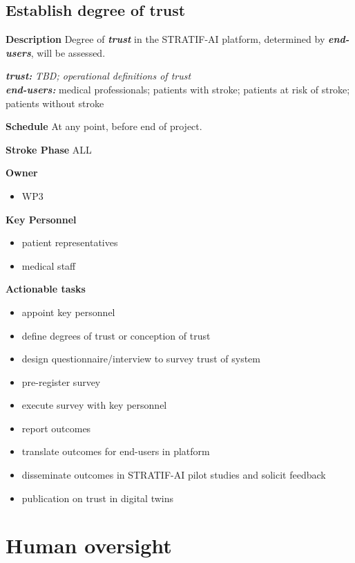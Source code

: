 \documentclass[
  letterpaper,
  DIV=11,
  numbers=noendperiod]{scrreport}
\providecommand{\tightlist}{%
  \setlength{\itemsep}{0pt}\setlength{\parskip}{0pt}}\usepackage{longtable,booktabs,array}
\begin{document}
\hypertarget{establish-degree-of-trust}{%
\subsection{Establish degree of trust}\label{establish-degree-of-trust}}

\textbf{Description} Degree of \textbf{\emph{trust}} in the STRATIF-AI
platform, determined by \textbf{\emph{end-users}}, will be assessed.

\textbf{\emph{trust:}} \emph{TBD; operational definitions of trust}\\
\textbf{\emph{end-users:}} medical professionals; patients with stroke;
patients at risk of stroke; patients without stroke

\textbf{Schedule} At any point, before end of project.

\textbf{Stroke Phase} ALL

\textbf{Owner}

\begin{itemize}
\tightlist
\item
  WP3
\end{itemize}

\textbf{Key Personnel}

\begin{itemize}
\tightlist
\item
  patient representatives
\item
  medical staff
\end{itemize}

\textbf{Actionable tasks}

\begin{itemize}
\tightlist
\item
  appoint key personnel
\item
  define degrees of trust or conception of trust
\item
  design questionnaire/interview to survey trust of system
\item
  pre-register survey
\item
  execute survey with key personnel
\item
  report outcomes
\item
  translate outcomes for end-users in platform
\item
  disseminate outcomes in STRATIF-AI pilot studies and solicit feedback
\item
  publication on trust in digital twins
\end{itemize}

\hypertarget{human-oversight}{%
\section{Human oversight}\label{human-oversight}}
\end{document}
